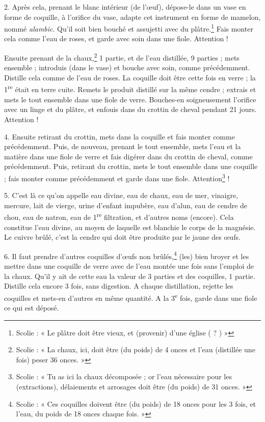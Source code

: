 \documentclass[a4paper, 11pt, oneside, polutonikogreek, french]{article}
\begin{document}
2. Après cela, prenant le blanc intérieur (de l'œuf), dépose-le dans un vase en forme de coquille, à l'orifice du vase, adapte cet instrument en forme de mamelon, nommé \emph{alambic}. Qu'il soit bien bouché et assujetti avec du plâtre.\footnote{Scolie : « Le plâtre doit être vieux, et (provenir) d'une église ( ? ) »} Fais monter cela comme l'eau de roses, et garde avec soin dans une fiole. Attention !

Ensuite prenant de la chaux,\footnote{Scolie : « La chaux, ici, doit être (du poids) de 4 onces et l'eau (distillée une fois) peser 36 onces. »} 1 partie, et de l'eau distillée, 9 parties ; mets ensemble ; introduis (dans le vase) et bouche avec soin, comme précédemment. Distille cela comme de l'eau de roses. La coquille doit être cette fois en verre ; la 1\textsuperscript{re} était en terre cuite. Remets le produit distillé sur la même cendre ; extrais et mets le tout ensemble dans une fiole de verre. Bouches-en soigneusement l'orifice avec un linge et du plâtre, et enfouis dans du crottin de cheval pendant 21 jours. Attention !

4. Ensuite retirant du crottin, mets dans la coquille et fais monter comme précédemment. Puis, de nouveau, prenant le tout ensemble, mets l'eau et la matière dans une fiole de verre et fais digérer dans du crottin de cheval, comme précédemment. Puis, retirant du crottin, mets le tout ensemble dans une coquille ; fais monter comme précédemment et garde dans une fiole. Attention\footnote{Scolie : « Tu as ici la chaux décomposée ; or l'eau nécessaire pour les (extractions), délaiements et arrosages doit être (du poids) de 31 onces. »} !

5. C'est là ce qu'on appelle eau divine, eau de chaux, eau de mer, vinaigre, mercure, lait de vierge, urine d'enfant impubère, eau d'alun, eau de cendre de chou, eau de natron, eau de 1\textsuperscript{re} filtration, et d'autres noms (encore). Cela constitue l'eau divine, au moyen de laquelle est blanchie le corps de la magnésie. Le cuivre brûlé, c'est la cendre qui doit être produite par le jaune des œufs.

6. Il faut prendre d'autres coquilles d'œufs non brûlés,\footnote{Scolie : « Ces coquilles doivent être (du poids) de 18 onces pour les 3 fois, et l'eau, du poids de 18 onces chaque fois. »} (les) bien broyer et les mettre dans une coquille de verre avec de l'eau montée une fois sans l'emploi de la chaux. Qu'il y ait de cette eau la valeur de 3 parties et des coquilles, 1 partie. Distille cela encore 3 fois, sans digestion. A chaque distillation, rejette les coquilles et mets-en d'autres en même quantité. A la 3\textsuperscript{e} fois, garde dans une fiole ce qui est déposé.
\end{document}
